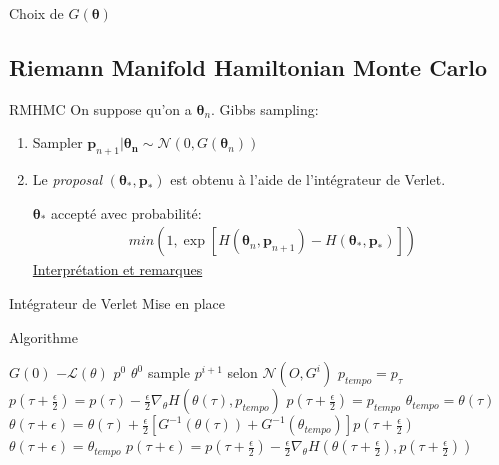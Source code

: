 \documentclass{beamer}
\begin{document}
  \begin{frame}{Choix de $G(\bm{\theta})$}
  
  \end{frame}

  
  
  \subsection{Riemann Manifold Hamiltonian Monte Carlo}
  
  \begin{frame}{RMHMC}
  On suppose qu'on a $\bm{\theta}_n$. Gibbs sampling:
  \begin{enumerate}
    \item Sampler $\bm{p}_{n+1}|\bm{\theta_n} \sim \mathcal{N}(0, G(\bm{\theta}_n))$
    \item Le \textit{proposal} $(\bm{\theta}_{*}, \bm{p}_*)$ est obtenu à l'aide de l'intégrateur de Verlet.
    
    $\bm{\theta}_{*}$ accepté avec probabilité: 
    \begin{align*}
    min(1, \exp[H(\bm{\theta}_n, \bm{p}_{n+1}) 
    - H(\bm{\theta}_*, \bm{p}_*)])
    \end{align*}
    \underline{Interprétation et remarques}
  \end{enumerate}
  \end{frame}  
  
  \begin{frame}{Intégrateur de Verlet}
	Mise en place	
	
  \end{frame}	  
      
  
  \begin{frame}{Algorithme}
  

\begin{algorithmic}
\REQUIRE $G(0)$ $-\mathcal{L}(\theta)$ $p^0$ $\theta^0$
{}
\STATE sample $p^{i+1}$ selon $\mathcal{N}(O,G^i)$
\STATE $p_{tempo}=p_\tau$
\STATE $p\left(\tau +\frac{\epsilon}{2}\right)=p\left(\tau\right)-\frac{\epsilon}{2}\nabla_\theta H\left(\theta(\tau),p_{tempo}\right)$
\ENDFOR
\STATE $p\left(\tau +\frac{\epsilon}{2}\right) =p_{tempo}$
\STATE $\theta_{tempo}=\theta(\tau)$
\STATE $\theta(\tau +\epsilon)=\theta(\tau)+\frac{\epsilon}{2}\left[G^{-1}\left(\theta(\tau)\right)+G^{-1}\left(\theta_{tempo}\right)\right]p\left(\tau+\frac{\epsilon}{2}\right)$
\ENDFOR
\STATE $\theta(\tau+\epsilon)=\theta_{tempo}$
\STATE $p(\tau+\epsilon)=p\left(\tau+\frac{\epsilon}{2}\right)-\frac{\epsilon}{2}\nabla_\theta H\left(\theta\left(\tau+\frac{\epsilon}{2}\right),p\left(\tau+\frac{\epsilon}{2}\right)\right)$
\ENDFOR
\ENDFOR
\end{algorithmic}

  \end{frame}
  
\end{document}
